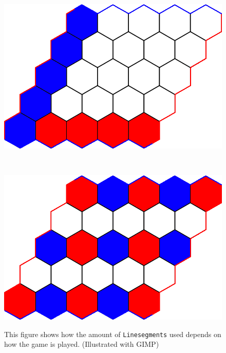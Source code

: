 \documentclass[a4paper]{article}
\begin{document}
\begin{figure}
\begin{minipage}[t]{.45\linewidth}
    \includegraphics[width=\linewidth]{figures/hexexample_twosegments_gimp.png}
    \label{fig:twosegments}
\end{minipage}
~
\begin{minipage}[t]{.45\linewidth}
    \includegraphics[width=\linewidth]{figures/hexexample_manysegments_gimp.png}
    \label{fig:manysegments}
\end{minipage}
\caption{This figure shows how the amount of \texttt{Linesegments} used depends on how the game is played. (Illustrated with GIMP) }
\end{figure}
\end{document}

